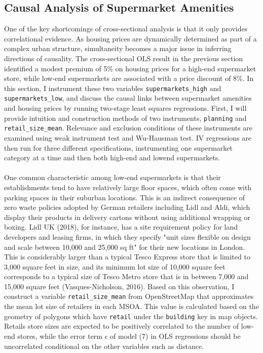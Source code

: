 \documentclass{article}
\begin{document}
\subsection{Causal Analysis of Supermarket Amenities} \label{subsection:iv}
One of the key shortcomings of cross-sectional analysis is that it only provides correlational evidence. As housing prices are dynamically determined as part of a complex urban structure, simultaneity becomes a major issue in inferring directions of causality. The cross-sectional OLS result in the previous section identified a modest premium of 5\% on housing prices for a high-end supermarket store, while low-end supermarkets are associated with a price discount of 8\%. In this section, I instrument these two variables \texttt{supermarkets\_high} and \texttt{supermarkets\_low}, and discuss the causal links between supermarket amenities and housing prices by running two-stage least squares regressions. First, I will provide intuition and construction methods of two instruments, \texttt{planning} and \texttt{retail\_size\_mean}. Relevance and exclusion conditions of these instruments are examined using weak instrument test and Wu-Hausman test. IV regressions are then run for three different specifications, instrumenting one supermarket category at a time and then both high-end and lowend supermarkets.\\\\
One common characteristic among low-end supermarkets is that their establishments tend to have relatively large floor spaces, which often come with parking spaces in their suburban locations. This is an indirect consequence of zero waste policies adopted by German retailers including Lidl and Aldi, which display their products in delivery cartons without using additional wrapping or boxing. Lidl UK (2018), for instance, has a site requirement policy for land developers and leasing firms, in which they specify "unit sizes flexible on design and scale between 10,000 and 25,000 sq ft" for their new locations in London. This is considerably larger than a typical Tesco Express store that is limited to 3,000 square feet in size, and its minimum lot size of 10,000 square feet corresponds to a typical size of Tesco Metro store that is in between 7,000 and 15,000 square feet (Vasques-Nicholson, 2016). Based on this observation, I construct a variable \texttt{retail\_size\_mean} from OpenStreetMap that approximates the mean lot size of retailers in each MSOA. This value is calculated based on the geometry of polygons which have \texttt{retail} under the \texttt{building} key in map objects. Retails store sizes are expected to be positively correlated to the number of low-end stores, while the error term $\epsilon$ of model (7) in OLS regressions should be uncorrelated conditional on the other variables such as distance.\\\\
\end{document}
